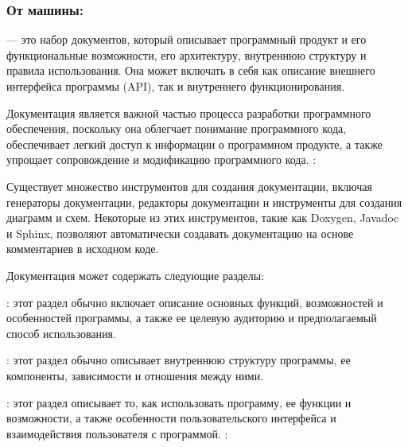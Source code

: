 \documentclass[letterpaper,10pt,russian]{sphinxmanual}
\begin{document}
\subsubsection{От машины:}
\label{\detokenize{educational_materials/stages/content:id16}}
\sphinxAtStartPar
{} — это набор документов, который описывает программный продукт и его функциональные возможности, его архитектуру, внутреннюю структуру и правила использования. Она может включать в себя как описание внешнего интерфейса программы (API), так и внутреннего функционирования.

\sphinxAtStartPar
Документация является важной частью процесса разработки программного обеспечения, поскольку она облегчает понимание программного кода, обеспечивает легкий доступ к информации о программном продукте, а также упрощает сопровождение и модификацию программного кода. : 

\sphinxAtStartPar
Существует множество инструментов для создания документации, включая генераторы документации, редакторы документации и инструменты для создания диаграмм и схем. Некоторые из этих инструментов, такие как Doxygen, Javadoc и Sphinx, позволяют автоматически создавать документацию на основе комментариев в исходном коде.

\sphinxAtStartPar
Документация может содержать следующие разделы:

\sphinxAtStartPar
{}: этот раздел обычно включает описание основных функций, возможностей и особенностей программы, а также ее целевую аудиторию и предполагаемый способ использования.

\sphinxAtStartPar
{}: этот раздел обычно описывает внутреннюю структуру программы, ее компоненты, зависимости и отношения между ними.

\sphinxAtStartPar
{}: этот раздел описывает то, как использовать программу, ее функции и возможности, а также особенности пользовательского интерфейса и взаимодействия пользователя с программой. : 
\end{document}
